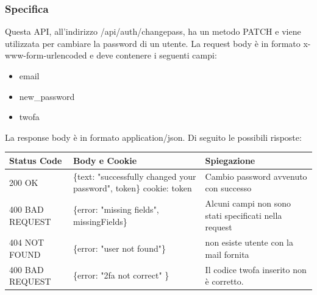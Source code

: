 \documentclass{report}
\begin{document}
\subsubsection*{Specifica}
Questa API, all'indirizzo /api/auth/changepass, ha un metodo PATCH e viene utilizzata per cambiare la password di un utente.
La request body è in formato x-www-form-urlencoded e deve contenere i seguenti campi:
\begin{itemize}
	\item email
	\item new\_password
	\item twofa
\end{itemize}
La response body è in formato application/json. Di seguito le possibili risposte:
\begin{center} %
	\centering
	\begin{tabular}{ |p{4cm}|p{5cm}|p{4cm}| }
		\hline
		\centering Status Code & \qquad\quad Body e Cookie                                           & \qquad\qquad Spiegazione                              \\ %
		\hline
		200 OK                 & \{text: "successfully changed your password", token\} cookie: token & Cambio password avvenuto con successo                 \\
		\hline
		400 BAD REQUEST        & \{error: "missing fields", missingFields\}                          & Alcuni campi non sono stati specificati nella request \\ %
		\hline
		404 NOT FOUND          & \{error: "user not found"\}                                         & non esiste utente con la mail fornita                 \\%
		\hline
		400 BAD REQUEST        & \{error: "2fa not correct" \}                                       & Il codice twofa inserito non è corretto.              \\
		\hline
	\end{tabular}
\end{center}
\end{document}
